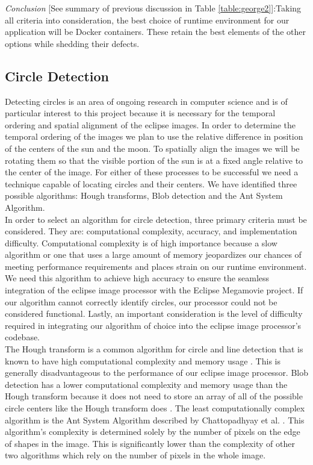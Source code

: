 \documentclass[10pt, onecolumn, draftclsnofoot, letterpaper, compsoc]{IEEEtran}
\begin{document}
\textit{Conclusion} [See summary of previous discussion in Table
\ref{table:george2}]:Taking all criteria into consideration, the best choice of runtime environment
for our application will be Docker containers. These retain the best elements of
the other options while shedding their defects. \\

\subsection{Circle Detection}

Detecting circles is an area of ongoing research in computer science and is of
particular interest to this project because it is necessary for the temporal
ordering and spatial alignment of the eclipse images. In order to determine the
temporal ordering of the images we plan to use the relative difference in
position of the centers of the sun and the moon. To spatially align the images
we will be rotating them so that the visible portion of the sun is at a fixed
angle relative to the center of the image. For either of these processes to be
successful we need a technique capable of locating circles and their centers. We
have identified three possible algorithms: Hough transforms, Blob detection and
the Ant System Algorithm. \\


In order to select an algorithm for circle detection, three primary criteria
must be considered. They are: computational complexity, accuracy, and
implementation difficulty. Computational complexity is of high importance
because a slow algorithm or one that uses a large amount of memory jeopardizes
our chances of meeting performance requirements and places strain on our runtime
environment. We need this algorithm to achieve high accuracy to ensure the
seamless integration of the eclipse image processor with the Eclipse Megamovie
project. If our algorithm cannot correctly identify circles, our processor could
not be considered functional. Lastly, an important consideration is the level of
difficulty required in integrating our algorithm of choice into the eclipse
image processor’s codebase. \\


The Hough transform is a common algorithm for circle and line detection that is
known to have high computational complexity and memory usage \cite{hough,
antsystem}. This is generally disadvantageous to the performance of our eclipse
image processor. Blob detection has a lower computational complexity and memory
usage than the Hough transform because it does not need to store an array of all
of the possible circle centers like the Hough transform does \cite{hough,
blobarticle, blobref}. The least computationally complex algorithm is the Ant
System Algorithm described by Chattopadhyay et al. \cite{antsystem}. This
algorithm’s complexity is determined solely by the number of pixels on the edge
of shapes in the image. This is significantly lower than the complexity of other
two algorithms which rely on the number of pixels in the whole image. \\
\end{document}
